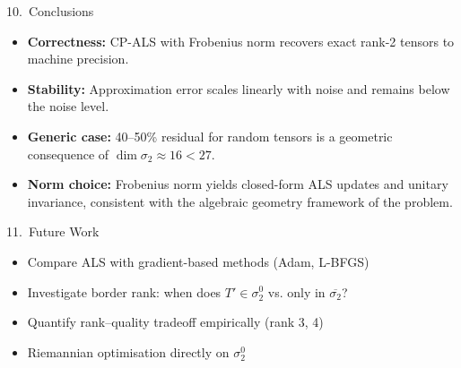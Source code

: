 \documentclass[final, 17pt]{beamer}
\newlength{\colw}
\begin{document}
\begin{frame}[t]
\begin{columns}[t, totalwidth=0.97\paperwidth]
\begin{column}{\colw}
\begin{block}{10.\ Conclusions}
  \begin{itemize}[leftmargin=1.4em, itemsep=5pt]
    \item \textbf{Correctness:} CP-ALS with Frobenius norm recovers
          exact rank-2 tensors to machine precision.
    \item \textbf{Stability:} Approximation error scales linearly with
          noise and remains below the noise level.
    \item \textbf{Generic case:} 40--50\% residual for random tensors
          is a geometric consequence of $\dim\sigma_2 \approx 16 < 27$.
    \item \textbf{Norm choice:} Frobenius norm yields closed-form ALS
          updates and unitary invariance, consistent with the algebraic
          geometry framework of the problem.
  \end{itemize}
\end{block}

\begin{block}{11.\ Future Work}
  \begin{itemize}[leftmargin=1.4em, itemsep=4pt]
    \item Compare ALS with gradient-based methods (Adam, L-BFGS)
    \item Investigate border rank: when does $T' \in \sigma_2^0$ vs.
          only in $\overline{\sigma_2}$?
    \item Quantify rank--quality tradeoff empirically (rank 3, 4)
    \item Riemannian optimisation directly on $\sigma_2^0$
  \end{itemize}
\end{block}

\end{column}

\end{columns}

\end{frame}
\end{document}
